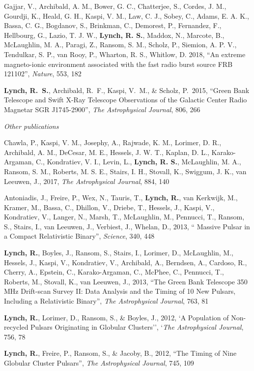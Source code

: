 \documentclass[10pt]{myNSF}
\begin{document}
\begin{itemize*}
{  Gajjar, V., Archibald, A. M., Bower, G. C., Chatterjee, S., Cordes,
  J. M., Gourdji, K., Heald, G. H., Kaspi, V. M., Law, C. J., Sobey,
  C., Adams, E. A. K., Bassa, C. G., Bogdanov, S., Brinkman, C.,
  Demorest, P., Fernandez, F., Hellbourg, G., Lazio, T. J. W.,
  \textbf{Lynch, R. S.}, Maddox, N., Marcote, B., McLaughlin, M. A.,
  Paragi, Z., Ransom, S. M., Scholz, P., Siemion, A. P. V., Tendulkar,
  S. P., van Rooy, P., Wharton, R. S., Whitlow, D. 2018, ``An extreme
  magneto-ionic environment associated with the fast radio burst
  source FRB 121102'', \emph{Nature}, 553, 182}
\item{\textbf{Lynch, R.~S.}, Archibald, R.~F., Kaspi, V.~M., \&
  Scholz, P.\ 2015, ``Green Bank Telescope and Swift X-Ray Telescope
  Observations of the Galactic Center Radio Magnetar SGR J1745-2900'',
  \emph{The Astrophysical Journal}, 806, 266}
\end{itemize*}

\newpage

\textit{Other publications}
\vspace{-1em}
\begin{itemize*}
\item{Chawla, P., Kaspi, V. M., Josephy, A., Rajwade, K. M., Lorimer,
  D. R., Archibald, A. M., DeCesar, M. E., Hessels, J. W. T., Kaplan,
  D. L., Karako-Argaman, C., Kondratiev, V. I., Levin, L.,
  \textbf{Lynch, R. S.}, McLaughlin, M. A., Ransom, S. M., Roberts,
  M. S. E., Stairs, I. H., Stovall, K., Swiggum, J. K., van Leeuwen,
  J., 2017, \emph{The Astrophysical Journal}, 884, 140}
\item{Antoniadis, J., Freire, P., Wex, N., Tauris, T., \textbf{Lynch,
    R.}, van Kerkwijk, M., Kramer, M., Bassa, C., Dhillon, V., Driebe,
  T., Hessels, J., Kaspi, V., Kondratiev, V., Langer, N., Marsh, T.,
  McLaughlin, M., Pennucci, T., Ransom, S., Stairs, I., van Leeuwen,
  J., Verbiest, J., Whelan, D., 2013, `` Massive Pulsar in a Compact
  Relativistic Binary'', \emph{Science}, 340, 448}
\item{\textbf{Lynch, R.}, Boyles, J., Ransom, S., Stairs, I., Lorimer,
    D., McLaughlin, M., Hessels, J., Kaspi, V., Kondratiev, V.,
    Archibald, A., Berndsen, A., Cardoso, R., Cherry, A., Epstein, C.,
    Karako-Argaman, C., McPhee, C., Pennucci, T., Roberts, M.,
    Stovall, K., van Leeuwen, J., 2013, ``The Green Bank Telescope 350
    MHz Drift-scan Survey II: Data Analysis and the Timing of 10 New
    Pulsars, Including a Relativistic Binary'', \emph{The
      Astrophysical Journal}, 763, 81}
\item{\textbf{Lynch, R.}, Lorimer, D., Ransom, S., \& Boyles, J.,
  2012, `A Population of Non-recycled Pulsars Originating in Globular
  Clusters'', `\emph{The Astrophysical Journal}, 756, 78}
\item{\textbf{Lynch, R.}, Freire, P., Ransom, S., \& Jacoby, B., 2012,
  ``The Timing of Nine Globular Cluster Pulsars'', \emph{The
    Astrophysical Journal}, 745, 109}
\end{itemize*}
\end{document}
